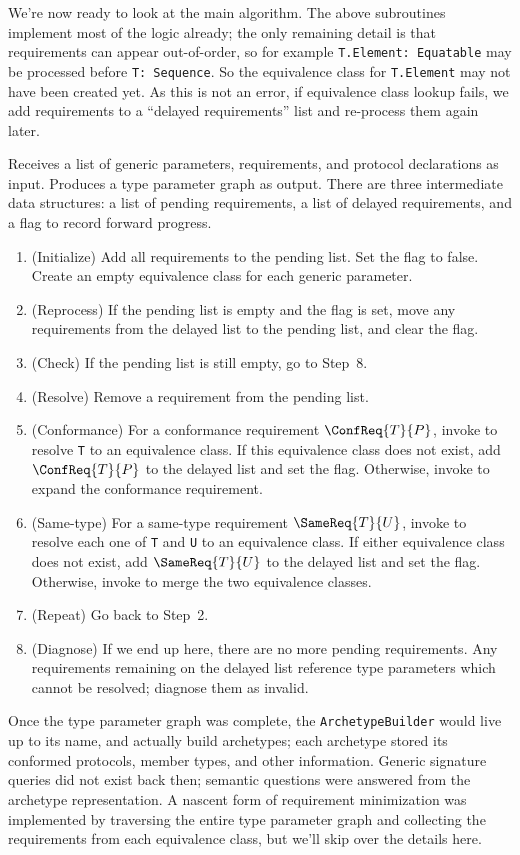 \documentclass[../generics]{subfiles}
\begin{document}
We're now ready to look at the main algorithm. The above subroutines implement most of the logic already; the only remaining detail is that requirements can appear out-of-order, so for example \texttt{T.Element:~Equatable} may be processed before \texttt{T:~Sequence}. So the equivalence class for \texttt{T.Element} may not have been created yet. As this is not an error, if equivalence class lookup fails, we add requirements to a ``delayed requirements'' list and re-process them again later.
\begin{algorithm}\label{archetypebuilder} Receives a list of generic parameters, requirements, and protocol declarations as input. Produces a type parameter graph as output.
There are three intermediate data structures: a list of pending requirements, a list of delayed requirements, and a flag to record forward progress.
\begin{enumerate}
\item (Initialize) Add all requirements to the pending list. Set the flag to false. Create an empty equivalence class for each generic parameter.
\item (Reprocess) If the pending list is empty and the flag is set, move any requirements from the delayed list to the pending list, and clear the flag.
\item (Check) If the pending list is still empty, go to Step~8.
\item (Resolve) Remove a requirement from the pending list.
\item (Conformance) For a conformance requirement $\ConfReq{T}{P}$, invoke  to resolve \texttt{T} to an equivalence class. If this equivalence class does not exist, add $\ConfReq{T}{P}$ to the delayed list and set the flag. Otherwise, invoke  to expand the conformance requirement.
\item (Same-type) For a same-type requirement $\SameReq{T}{U}$, invoke  to resolve each one of \texttt{T} and \texttt{U} to an equivalence class. If either equivalence class does not exist, add $\SameReq{T}{U}$ to the delayed list and set the flag. Otherwise, invoke  to merge the two equivalence classes.
\item (Repeat) Go back to Step~2.
\item (Diagnose) If we end up here, there are no more pending requirements. Any requirements remaining on the delayed list reference type parameters which cannot be resolved; diagnose them as invalid.
\end{enumerate}
\end{algorithm}
Once the type parameter graph was complete, the \texttt{ArchetypeBuilder} would live up to its name, and actually build archetypes; each archetype stored its conformed protocols, member types, and other information. Generic signature queries did not exist back then; semantic questions were answered from the archetype representation. A nascent form of requirement minimization was implemented by traversing the entire type parameter graph and collecting the requirements from each equivalence class, but we'll skip over the details here.
\end{document}
